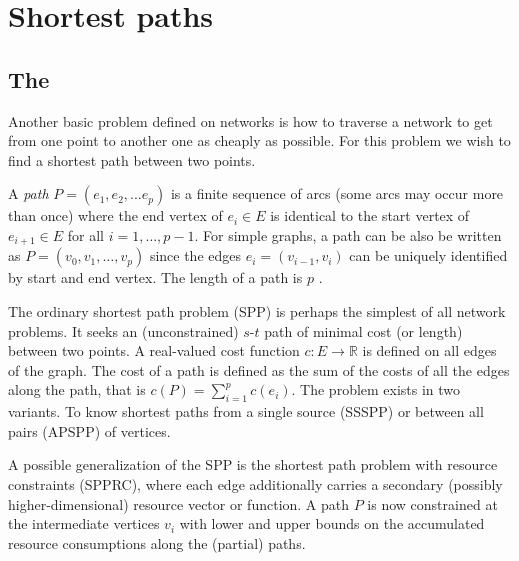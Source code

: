 \chapter{Shortest paths}\label{ch:4}

\section{The \spprc{}}
Another basic problem defined on networks is how to traverse a network to get from one point to another one as cheaply as possible. For this problem we wish to find a shortest path between two points.

\begin{definition}[path]
A \textit{path} $P = (e_1, e_2, ... e_p)$ is a finite sequence of arcs (some arcs may occur more than once) where the end vertex of $e_i \in E$ is identical to the start vertex of $e_{i+1} \in E$ for all $i=1,\dots,p-1$. For simple graphs, a path can be also be written as $P = (v_0,v_1,\dots,v_p)$ since the edges $e_i=(v_{i-1},v_i)$ can be uniquely identified by start and end vertex. The length of a path is $p$ \cite{irnich2005shortest}.
\end{definition}


\begin{definition}[SPP]
The ordinary shortest path problem (SPP) is perhaps the simplest of all network problems. It seeks an (unconstrained) $s$-$t$ path of minimal cost (or length) between two points. A real-valued cost function $c : E \rightarrow \mathbb{R}$ is defined on all edges of the graph. The cost of a path is defined as the sum of the costs of all the edges along the path, that is $c(P)=\sum_{i=1}^p c(e_i)$. The problem exists in two variants. To know shortest paths from a single source (SSSPP) or between all pairs (APSPP) of vertices.
\end{definition}

\begin{definition}[SPPRC]
A possible generalization of the SPP is the shortest path problem with resource constraints (SPPRC), where each edge additionally carries a secondary (possibly higher-dimensional) resource vector or function. A path $P$ is now constrained at the intermediate vertices $v_i$ with lower and upper bounds on the accumulated resource consumptions along the (partial) paths.
\end{definition}

